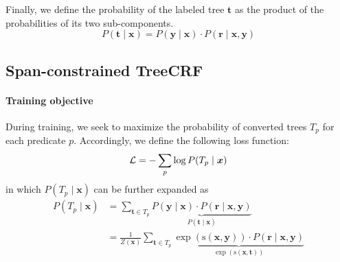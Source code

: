\documentclass[11pt]{article}
\begin{document}
Finally, we define the probability of the labeled tree $\boldsymbol{t}$ as the product of the probabilities of its two sub-components.
\begin{equation}
    P(\boldsymbol{t}\mid \boldsymbol{x}) = P(\boldsymbol{y}\mid\boldsymbol{x})\cdot P(\boldsymbol{r}\mid\boldsymbol{x},\boldsymbol{y})
\end{equation}

\subsection{Span-constrained TreeCRF}\label{sec:span-constrained-treecrf}

\paragraph{Training objective}
During training, we seek to maximize the probability of converted trees $T_p$ for each predicate $p$.
Accordingly, we define the following loss function:
\begin{equation}
    \mathcal{L} = - \sum_p\log P(T_p\mid\boldsymbol{x}) \\
\end{equation}
in which $P(T_p\mid\boldsymbol{x})$ can be further expanded as
\begin{equation}\label{eq:prob}
    \begin{aligned}
        P(T_p \mid\boldsymbol{x}) & =\sum_{\boldsymbol{t}\in T_p} \underbrace{P(\boldsymbol{y}\mid \boldsymbol{x})\cdot P(\boldsymbol{r}\mid \boldsymbol{x}, \boldsymbol{y})}_{P(\boldsymbol{t}\mid\boldsymbol{x})}                                                  \\
                                  & = \frac{1}{Z(\boldsymbol{x})}\sum_{\boldsymbol{t}\in T_p}\underbrace{\exp(\mathrm{s}(\boldsymbol{x},\boldsymbol{y}))\cdot P(\boldsymbol{r}\mid \boldsymbol{x},\boldsymbol{y})}_{\exp(\mathrm{s}(\boldsymbol{x},\boldsymbol{t}))}
    \end{aligned}
\end{equation}
\end{document}
